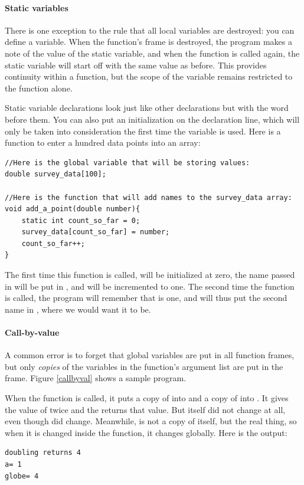 \documentclass[12pt]{article}
\makeatletter
\def\ttind#1{\index{#1@\cinline{#1}}\cinline{#1}}
\makeatother
\begin{document}
\paragraph{Static variables} There is one exception to the rule that
all local variables are destroyed: you can define a 
variable. When the function's frame is destroyed, the program makes a
note of the value of the  static variable, and when the function is called
again, the static variable will start off with the same value
as before. This provides continuity within a function, but the scope
of the variable remains restricted to the function alone.

Static variable declarations look just like other declarations but with
the word \ttind{static} before them. You can also put an initialization on
the declaration line, which will only be taken into consideration the
first time the variable is used. Here is a function to enter a hundred
data points into an array:
\begin{lstlisting}
//Here is the global variable that will be storing values:
double survey_data[100];

//Here is the function that will add names to the survey_data array:
void add_a_point(double number){
    static int count_so_far = 0;
    survey_data[count_so_far] = number;
    count_so_far++;
}
\end{lstlisting}

The first time this function is called, 
will be initialized at zero, the name passed in will be put in
, and  will be
incremented to one. The second time the function is called, the program
will remember that  is one, and will thus put the
second name in , where we would want it to be.

\paragraph{Call-by-value} 
A common error is to forget that global variables are put in all function
frames, but only {\sl copies} of the variables in the function's argument
list are put in the frame.  Figure \ref{callbyval} shows a sample program.


When the  function is called, it puts a copy of  into  and a copy of 
into . It gives  the value of twice  and the returns that value. But 
itself did not change at all, even though  did change. Meanwhile,  is not a copy of
itself, but the real thing, so when it is changed inside the function, it changes globally.
Here is the output:
\begin{lstlisting}
doubling returns 4
a= 1
globe= 4
\end{lstlisting}
\end{document}

